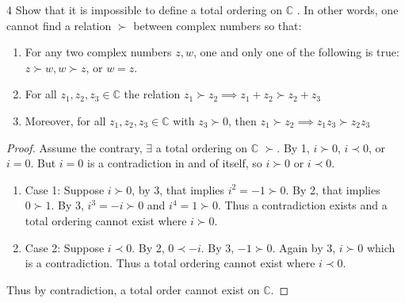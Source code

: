 \documentclass{article}
\newcommand{\C}{\mathbb{C}}
\begin{document}
\begin{PROB}{4}\label{Problem 4.}
    Show that it is impossible to define a total ordering on $\C$ . In other words, one cannot find a relation $\succ$  between complex numbers so that:

    \begin{enumerate}
        \item For any two complex numbers $z, w$, one and only one of the following is true: $z \succ w, w \succ z$, or $w = z$. 
        \item For all $z_1, z_2, z_3 \in \C$ the relation $z_1 \succ z_2 \implies z_1 + z_2 \succ z_2 + z_3$
        \item Moreover, for all $z_1, z_2, z_3 \in \C$ with $z_3 \succ 0$, then $z_1 \succ z_2 \implies z_1 z_3 \succ z_2 z_3$        
    \end{enumerate}
\end{PROB}
\begin{proof}
    Assume the contrary, $\exists$ a total ordering on $\C$ $\succ$. By 1, $i \succ 0$, $i \prec 0$, or $i = 0$. But $i = 0$ is a contradiction in and of itself, so $i \succ 0$ or $i \prec 0$.       
    
    \begin{enumerate}
        \item Case 1: Suppose $i \succ 0$, by 3, that implies $i^2 = -1 \succ 0$. By 2, that implies $0 \succ 1$. By 3, $i^3 = -i \succ 0$ and $i^4 = 1 \succ 0$. Thus a contradiction exists and a total ordering cannot exist where $i \succ 0$.
        \item Case 2: Suppose $i \prec 0$. By 2, $0 \prec -i$. By 3, $-1 \succ 0$. Again by 3, $i \succ 0$ which is a contradiction. Thus a total ordering cannot exist where $i \prec 0$.     
    \end{enumerate}

    Thus by contradiction, a total order cannot exist on $\C$. 
\end{proof}

\bigskip
\end{document}
